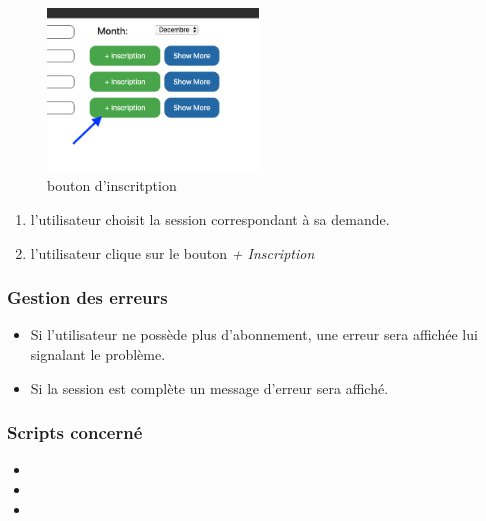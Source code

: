 \begin{figure}[!h]
	\includegraphics[width=0.5\textwidth,center]{Figures/us3-1}
	\caption{bouton d'inscritption}
\end{figure}

\begin{enumerate}
	\item l'utilisateur choisit la session correspondant à sa demande.
	\item l'utilisateur clique sur le bouton  \textit{+ Inscription}
\end{enumerate}

\subsubsection{Gestion des erreurs}
	\begin{itemize}
		\item Si l'utilisateur ne possède plus d'abonnement, une erreur sera affichée lui signalant le problème. 
		\item Si la session est complète un message d'erreur sera affiché. 
	\end{itemize}
	
\subsubsection{Scripts concerné}
	\begin{itemize}
		\item {}
		\item {}
		\item {}
	\end{itemize}